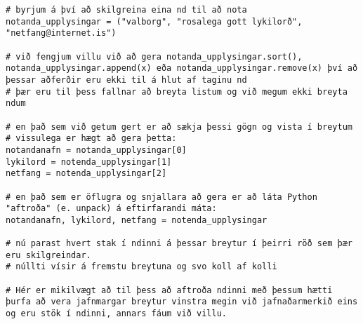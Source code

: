\begin{lstlisting}[caption=Ndir notaðar, label=lst:nd-notkun]
# byrjum á því að skilgreina eina nd til að nota
notanda_upplysingar = ("valborg", "rosalega gott lykilorð", "netfang@internet.is")

# við fengjum villu við að gera notanda_upplysingar.sort(), notanda_upplysingar.append(x) eða notanda_upplysingar.remove(x) því að þessar aðferðir eru ekki til á hlut af taginu nd
# þær eru til þess fallnar að breyta listum og við megum ekki breyta ndum

# en það sem við getum gert er að sækja þessi gögn og vista í breytum
# vissulega er hægt að gera þetta:
notandanafn = notanda_upplysingar[0]
lykilord = notenda_upplysingar[1]
netfang = notenda_upplysingar[2]

# en það sem er öflugra og snjallara að gera er að láta Python "aftroða" (e. unpack) á eftirfarandi máta:
notandanafn, lykilord, netfang = notenda_upplysingar

# nú parast hvert stak í ndinni á þessar breytur í þeirri röð sem þær eru skilgreindar.
# núllti vísir á fremstu breytuna og svo koll af kolli

# Hér er mikilvægt að til þess að aftroða ndinni með þessum hætti þurfa að vera jafnmargar breytur vinstra megin við jafnaðarmerkið eins og eru stök í ndinni, annars fáum við villu. 

\end{lstlisting}